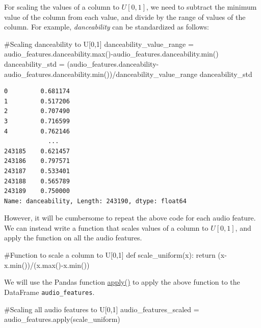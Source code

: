 \documentclass[
  letterpaper,
  DIV=11,
  numbers=noendperiod]{scrreprt}
\newenvironment{Shaded}{\begin{snugshade}}{\end{snugshade}}
\newcommand{\BuiltInTok}[1]{\textcolor[rgb]{0.00,0.23,0.31}{#1}}
\newcommand{\CommentTok}[1]{\textcolor[rgb]{0.37,0.37,0.37}{#1}}
\newcommand{\ControlFlowTok}[1]{\textcolor[rgb]{0.00,0.23,0.31}{#1}}
\newcommand{\KeywordTok}[1]{\textcolor[rgb]{0.00,0.23,0.31}{#1}}
\newcommand{\NormalTok}[1]{\textcolor[rgb]{0.00,0.23,0.31}{#1}}
\newcommand{\OperatorTok}[1]{\textcolor[rgb]{0.37,0.37,0.37}{#1}}
\begin{document}
For scaling the values of a column to \(U[0,1]\), we need to subtract
the minimum value of the column from each value, and divide by the range
of values of the column. For example, \emph{danceability} can be
standardized as follows:

\begin{Shaded}
\begin{Highlighting}[]
\CommentTok{\#Scaling danceability to U[0,1]}
\NormalTok{danceability\_value\_range }\OperatorTok{=}\NormalTok{ audio\_features.danceability.}\BuiltInTok{max}\NormalTok{()}\OperatorTok{{-}}\NormalTok{audio\_features.danceability.}\BuiltInTok{min}\NormalTok{()}
\NormalTok{danceability\_std }\OperatorTok{=}\NormalTok{ (audio\_features.danceability}\OperatorTok{{-}}\NormalTok{audio\_features.danceability.}\BuiltInTok{min}\NormalTok{())}\OperatorTok{/}\NormalTok{danceability\_value\_range}
\NormalTok{danceability\_std}
\end{Highlighting}
\end{Shaded}

\begin{verbatim}
0         0.681174
1         0.517206
2         0.707490
3         0.716599
4         0.762146
            ...   
243185    0.621457
243186    0.797571
243187    0.533401
243188    0.565789
243189    0.750000
Name: danceability, Length: 243190, dtype: float64
\end{verbatim}

However, it will be cumbersome to repeat the above code for each audio
feature. We can instead write a function that scales values of a column
to \(U[0,1]\), and apply the function on all the audio features.

\begin{Shaded}
\begin{Highlighting}[]
\CommentTok{\#Function to scale a column to U[0,1]}
\KeywordTok{def}\NormalTok{ scale\_uniform(x):}
    \ControlFlowTok{return}\NormalTok{ (x}\OperatorTok{{-}}\NormalTok{x.}\BuiltInTok{min}\NormalTok{())}\OperatorTok{/}\NormalTok{(x.}\BuiltInTok{max}\NormalTok{()}\OperatorTok{{-}}\NormalTok{x.}\BuiltInTok{min}\NormalTok{())}
\end{Highlighting}
\end{Shaded}

We will use the Pandas function
\href{https://pandas.pydata.org/docs/reference/api/pandas.DataFrame.apply.html}{apply()}
to apply the above function to the DataFrame \texttt{audio\_features}.

\begin{Shaded}
\begin{Highlighting}[]
\CommentTok{\#Scaling all audio features to U[0,1]}
\NormalTok{audio\_features\_scaled }\OperatorTok{=}\NormalTok{ audio\_features.}\BuiltInTok{apply}\NormalTok{(scale\_uniform)}
\end{Highlighting}
\end{Shaded}
\end{document}
